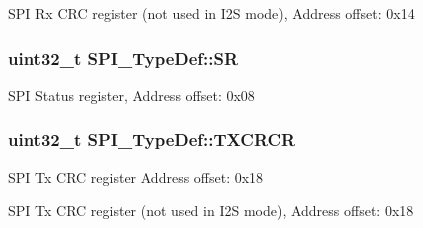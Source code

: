 S\-P\-I Rx C\-R\-C register (not used in I2\-S mode), Address offset\-: 0x14 \hypertarget{struct_s_p_i___type_def_a33f3dd6a505d06fe6c466b63be451891}{
\subsubsection[{S\-R}]{ uint32\-\_\-t S\-P\-I\-\_\-\-Type\-Def\-::\-S\-R}}\label{struct_s_p_i___type_def_a33f3dd6a505d06fe6c466b63be451891}
S\-P\-I Status register, Address offset\-: 0x08 \hypertarget{struct_s_p_i___type_def_a0b5a7f6383eb478bbcc22a36c5e95ae6}{
\subsubsection[{T\-X\-C\-R\-C\-R}]{ uint32\-\_\-t S\-P\-I\-\_\-\-Type\-Def\-::\-T\-X\-C\-R\-C\-R}}\label{struct_s_p_i___type_def_a0b5a7f6383eb478bbcc22a36c5e95ae6}
S\-P\-I Tx C\-R\-C register Address offset\-: 0x18

S\-P\-I Tx C\-R\-C register (not used in I2\-S mode), Address offset\-: 0x18 

